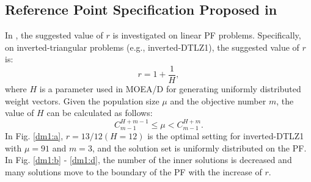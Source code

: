 \documentclass[conference]{IEEEtran}
\begin{document}
\subsection{Reference Point Specification Proposed in \cite{hisao:RPhowtoSpecify}}
In \cite{hisao:RPexplanation, hisao:RPhowtoSpecify, hisao:RPspecify}, the suggested value of $r$ is investigated 
on linear PF problems. 
Specifically, on inverted-triangular problems (e.g., inverted-DTLZ1\cite{hisao:RPexplanation}), 
the suggested value of $r$ is: 
\begin{equation}\label{eod}
  r=1+\frac{1}{H},
\end{equation}
where $H$ is a parameter used in MOEA/D\cite{MOEAD} for 
generating uniformly distributed weight vectors\cite{hisao:dynamic}. 
Given the population size $\mu$ and the objective number $m$, the value of $H$ can be calculated as follows:
\begin{equation}
  C^{H+m-1}_{m-1} \leq \mu < C^{H+m}_{m-1}.
\end{equation}
In Fig. \ref{dm1:a}, $r=13/12 (H=12)$ is the optimal setting for inverted-DTLZ1 with $\mu = 91$ and $m = 3$, 
and the solution set is uniformly distributed on the PF. 
In Fig. \ref{dm1:b} - \ref{dm1:d}, the number of the inner solutions is decreased and many solutions move to 
the boundary of the PF with the increase of $r$. 
\end{document}
